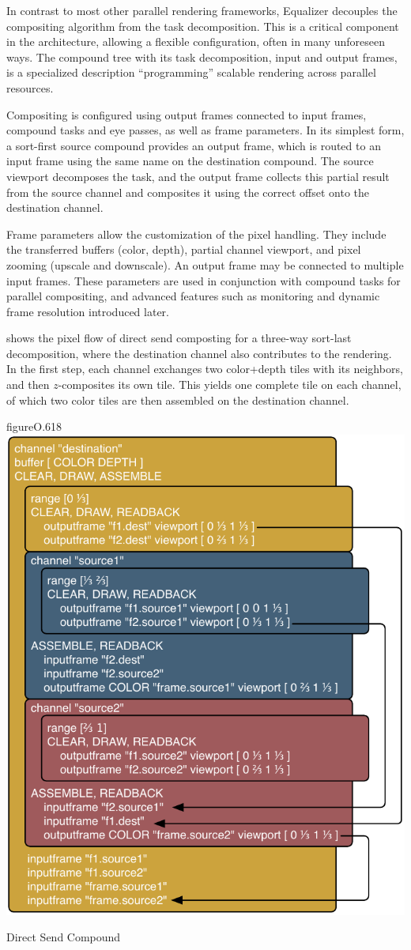 In contrast to most other parallel rendering frameworks, Equalizer decouples the
compositing algorithm from the task decomposition. This is a critical component
in the architecture, allowing a flexible configuration, often in many unforeseen
ways. The compound tree with its task decomposition, input and output frames, is
a specialized description ``programming'' scalable rendering across parallel
resources.

Compositing is configured using output frames connected to input frames,
compound tasks and eye passes, as well as frame parameters. In its simplest
form, a sort-first source compound provides an output frame, which is routed
to an input frame using the same name on the destination compound. The source
viewport decomposes the task, and the output frame collects this partial result
from the source channel and composites it using the correct offset onto the
destination channel.

Frame parameters allow the customization of the pixel handling. They include the
transferred buffers (color, depth), partial channel viewport, and pixel zooming
(upscale and downscale). An output frame may be connected to multiple input
frames. These parameters are used in conjunction with compound tasks for
parallel compositing, and advanced features such as monitoring and dynamic frame
resolution introduced later.

 shows the pixel flow of direct send composting for a three-way
sort-last decomposition, where the destination channel also contributes to the
rendering. In the first step, each channel exchanges two color+depth tiles with
its neighbors, and then $z$-composites its own tile. This yields one complete
tile on each channel, of which two color tiles are then assembled on the
destination channel.

\begin{wrapfloat}{figure}{O}{.618\textwidth}
  \includegraphics[width=.618\textwidth]{images/directSendCompound}
  {\caption{\label{fDirectSendCmp}Direct Send Compound}}
\end{wrapfloat}

